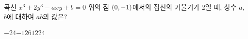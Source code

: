 곡선 $x^3+2y^3-axy+b=0$ 위의 점 $(0{,}\mkern3mu\mathopen{}-1)$에서의 접선의 기울기가 $2$일 때, 상수 $a$, $b$에 대하여 $ab$의 값은?
\begin{choices32}{$-24$}{$-12$}{$6$}{$12$}{$24$}\end{choices32}
